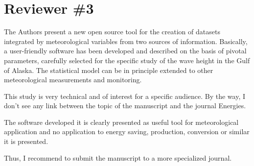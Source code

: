\documentclass[a4paper,twoside,11pt]{article}
\newcounter{comments}[section]
\newcommand{\rcomment}[1]
{
	\stepcounter{comments}
	\vspace{0.6cm}
	\begin{tcolorbox}[colback=black!5,colframe=white!45!black,title=Comment \arabic{comments}]
		#1
	\end{tcolorbox}
}
\begin{document}
\clearpage

\addtocounter{section}{+2}
\section{Reviewer \#3}
\addtocounter{section}{-2}

\rcomment{
The Authors present a new open source tool for the creation of datasets integrated by meteorological variables from two sources
of information. Basically, a user-friendly software has been developed and described on the basis of pivotal parameters, carefully selected for the specific study of the wave height in the Gulf of Alaska. The statistical model can be in principle extended to other meteorological measurements and monitoring. 

\vspace{0.5cm}
This study is very technical and of interest for a specific audience. By the way, I don’t see any link between the topic of the manuscript and the journal Energies.

\vspace{0.5cm}
The software developed it is clearly presented as useful tool for meteorological application and no application to energy saving, production, conversion or similar it is presented.

\vspace{0.5cm}
Thus, I recommend to submit the manuscript to a more specialized journal.
}
\end{document}
